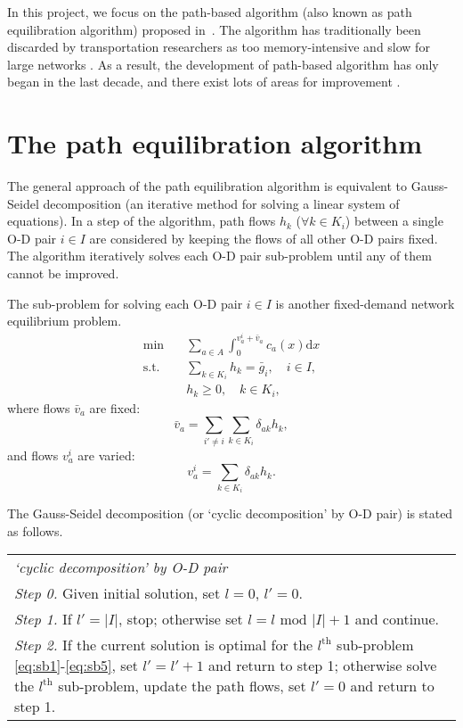 In this project, we focus on the path-based algorithm (also known as path equilibration algorithm) proposed in~\citet{Dafermos1969}.
The algorithm has traditionally been discarded by transportation researchers as too memory-intensive and slow for large networks \citep{Jayakrishnan1994}.
As a result, the development of path-based algorithm has only began in the last decade, and there exist lots of areas for improvement \citep{Olga2013}.

\section{The path equilibration algorithm}
The general approach of the path equilibration algorithm is equivalent to
Gauss-Seidel decomposition (an iterative method for solving a linear system of equations).
In a step of the algorithm,
path flows $h_k$ ($\forall k \in K_i$) between a single O-D pair $i \in I$ are considered by keeping the flows of all other O-D pairs fixed.
The algorithm iteratively solves each O-D pair sub-problem until any of them cannot be improved.

The sub-problem for solving each O-D pair $i \in I$ is another fixed-demand network equilibrium problem.
\begin{align} \label{eq:sb1}
    \min & \quad \sum_{a \in A} \int_0^{v_a^i + \bar{v}_a} c_a(x) \mathrm{d} x \\
    \text{s.t.} &\quad \sum_{k \in K_i} h_k = \bar{g}_i, \quad i \in I, \\
    & \quad h_k \geq 0, \quad k \in K_i,
\end{align}
where flows $\bar{v}_a$ are fixed:
\begin{equation}
    \bar{v}_a = \sum_{i' \neq i} \sum_{k \in K_i} \delta_{ak} h_k,
\end{equation}
and flows $v_a^i$ are varied:
\begin{equation} \label{eq:sb5}
    v_a^i = \sum_{k \in K_i} \delta_{ak} h_k.
\end{equation}

The Gauss-Seidel decomposition (or `cyclic decomposition' by O-D pair) is stated as follows.
\begin{table}[H]
    \begin{tabular}{ m{} }
        \hspace{-.5cm}\emph{`cyclic decomposition' by O-D pair} \citep{Florian} \\
        \emph{Step 0.} Given initial solution, set $l = 0$, $l' = 0$.\\
        \emph{Step 1.} If $l' = |I|$, stop; otherwise set $l = l \text{ mod } |I| + 1$ and continue.\\
        \emph{Step 2.} If the current solution is optimal for the $l^\text{th}$ sub-problem \eqref{eq:sb1}-\eqref{eq:sb5}, set $l' = l' + 1$ and return to step 1; otherwise solve the $l^\text{th}$ sub-problem, update the path flows, set $l' = 0$ and return to step 1.\\
    \end{tabular}
\end{table}

